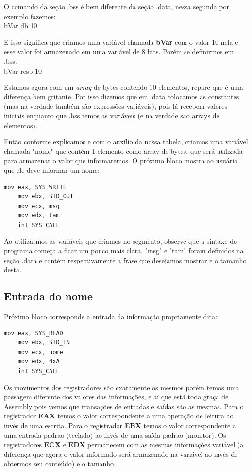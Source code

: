 O comando da seção .bss é bem diferente da seção .data, nessa segunda por exemplo fazemos: \\
{\ttfamily bVar db 10}

E isso significa que criamos uma variável chamada \textbf{bVar} com o valor 10 nela e esse valor foi armazenado em uma variável de 8 bits. Porém se definirmos em .bss: \\
{\ttfamily bVar resb 10}

Estamos agora com um \textit{array} de bytes contendo 10 elementos, repare que é uma diferença bem gritante. Por isso dizemos que em .data colocamos as constantes (mas na verdade também são expressões variáveis), pois lá recebem valores iniciais enquanto que .bss temos as variáveis (e na verdade são arrays de elementos).

Então conforme explicamos e com o auxílio da nossa tabela, criamos uma variável chamada "nome" que contém 1 elemento como array de bytes, que será utilizada para armazenar o valor que informaremos. O próximo bloco mostra ao usuário que ele deve informar um nome:
\begin{lstlisting}[]
	mov eax, SYS_WRITE
	mov ebx, STD_OUT
	mov ecx, msg
	mov edx, tam
	int SYS_CALL
\end{lstlisting}

Ao utilizarmos as variáveis que criamos no segmento, observe que a sintaxe do programa começa a ficar um pouco mais clara, "msg" e "tam" foram definidos na seção .data e contém respectivamente a frase que desejamos mostrar e o tamanho desta.

\subsection{Entrada do nome}

Próximo bloco corresponde a entrada da informação propriamente dita:
\begin{lstlisting}[]
	mov eax, SYS_READ
	mov ebx, STD_IN
	mov ecx, nome
	mov edx, 0xA
	int SYS_CALL
\end{lstlisting}

Os movimentos dos registradores são exatamente os mesmos porém temos uma passagem diferente dos valores das informações, e aí que está toda graça de Assembly pois vemos que transações de entradas e saídas são as mesmas. Para o registrador \textbf{EAX} temos o valor correspondente a uma operação de leitura ao invés de uma escrita. Para o registrador \textbf{EBX} temos o valor correspondente a uma entrada padrão (teclado) ao invés de uma saída padrão (monitor). Os registradores \textbf{ECX} e \textbf{EDX} permanecem com as mesmas informações variável (a diferença que agora o valor informado será armazenado na variável ao invés de obtermos seu conteúdo) e o tamanho.

